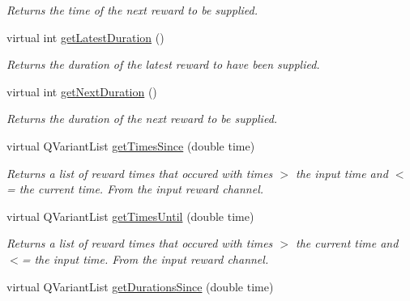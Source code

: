 \begin{DoxyCompactItemize}
\begin{DoxyCompactList}\small\item\em Returns the time of the next reward to be supplied. \end{DoxyCompactList}\item 
\hypertarget{class_picto_1_1_live_reward_reader_a3b817715680546792ff52387e194e78c}{virtual int \hyperlink{class_picto_1_1_live_reward_reader_a3b817715680546792ff52387e194e78c}{get\-Latest\-Duration} ()}\label{class_picto_1_1_live_reward_reader_a3b817715680546792ff52387e194e78c}

\begin{DoxyCompactList}\small\item\em Returns the duration of the latest reward to have been supplied. \end{DoxyCompactList}\item 
\hypertarget{class_picto_1_1_live_reward_reader_a93bf6a8af84161c69fc63115c321fc1c}{virtual int \hyperlink{class_picto_1_1_live_reward_reader_a93bf6a8af84161c69fc63115c321fc1c}{get\-Next\-Duration} ()}\label{class_picto_1_1_live_reward_reader_a93bf6a8af84161c69fc63115c321fc1c}

\begin{DoxyCompactList}\small\item\em Returns the duration of the next reward to be supplied. \end{DoxyCompactList}\item 
\hypertarget{class_picto_1_1_live_reward_reader_a8d510c6e0411de019dc58edbd127ba7b}{virtual Q\-Variant\-List \hyperlink{class_picto_1_1_live_reward_reader_a8d510c6e0411de019dc58edbd127ba7b}{get\-Times\-Since} (double time)}\label{class_picto_1_1_live_reward_reader_a8d510c6e0411de019dc58edbd127ba7b}

\begin{DoxyCompactList}\small\item\em Returns a list of reward times that occured with times $>$ the input time and $<$= the current time. From the input reward channel. \end{DoxyCompactList}\item 
\hypertarget{class_picto_1_1_live_reward_reader_aaa642f941e1bc609dca54c8c98208700}{virtual Q\-Variant\-List \hyperlink{class_picto_1_1_live_reward_reader_aaa642f941e1bc609dca54c8c98208700}{get\-Times\-Until} (double time)}\label{class_picto_1_1_live_reward_reader_aaa642f941e1bc609dca54c8c98208700}

\begin{DoxyCompactList}\small\item\em Returns a list of reward times that occured with times $>$ the current time and $<$= the input time. From the input reward channel. \end{DoxyCompactList}\item 
\hypertarget{class_picto_1_1_live_reward_reader_a81f56c9bf3c4a2f839d21e5a5eab1480}{virtual Q\-Variant\-List \hyperlink{class_picto_1_1_live_reward_reader_a81f56c9bf3c4a2f839d21e5a5eab1480}{get\-Durations\-Since} (double time)}\label{class_picto_1_1_live_reward_reader_a81f56c9bf3c4a2f839d21e5a5eab1480}


\end{DoxyCompactItemize}
